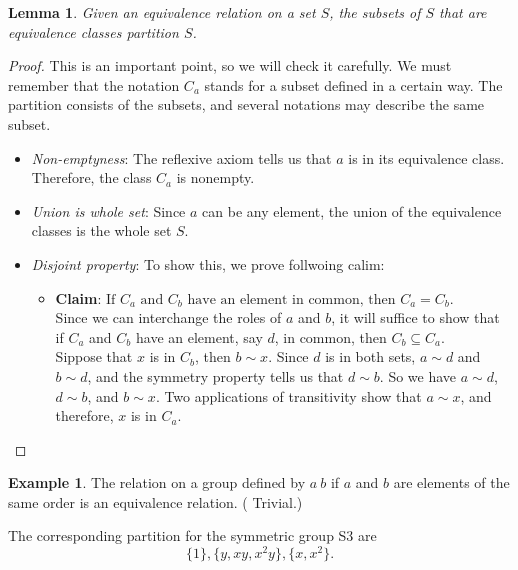 \documentclass[
]{book}
\providecommand{\tightlist}{%
  \setlength{\itemsep}{0pt}\setlength{\parskip}{0pt}}
\newtheorem{lemma}{Lemma}[chapter]
\theoremstyle{definition}
\theoremstyle{definition}
\newtheorem{example}{Example}[chapter]
\theoremstyle{definition}
\theoremstyle{definition}
\theoremstyle{remark}
\begin{document}
\begin{lemma}
\protect\hypertarget{lem:unnamed-chunk-28}{}\label{lem:unnamed-chunk-28}Given an equivalence relation on a set \(S\), the subsets of \(S\) that are equivalence classes partition \(S\).
\end{lemma}

\begin{proof}

This is an important point, so we will check it carefully. We must remember that the notation \(C_a\) stands for a subset defined in a certain way. The partition consists of the subsets, and several notations may describe the same subset.

\begin{itemize}
\item
  \emph{Non-emptyness}: The reflexive axiom tells us that \(a\) is in its equivalence class. Therefore, the class \(C_a\) is nonempty.
\item
  \emph{Union is whole set}: Since \(a\) can be any element, the union of the equivalence classes is the whole set \(S\).
\item
  \emph{Disjoint property}: To show this, we prove follwoing calim:

  \begin{itemize}
  \tightlist
  \item
    \textbf{Claim}: \(\text{If } C_a \text{ and } C_b \text{ have an element in common, then } C_a = C_b\).\\
    Since we can interchange the roles of \(a\) and \(b\), it will suffice to show that if \(C_a\) and \(C_b\) have an element, say \(d\), in common, then \(C_b \subseteq C_a\).\\
    Sippose that \(x\) is in \(C_b\), then \(b \sim x\). Since \(d\) is in both sets, \(a \sim d\) and \(b \sim d\), and the symmetry property tells us that \(d \sim b\). So we have \(a \sim d\), \(d \sim b\), and \(b \sim x\). Two applications of transitivity show that \(a \sim x\), and therefore, \(x\) is in \(C_a\).
  \end{itemize}
\end{itemize}

\end{proof}

\begin{example}
\protect\hypertarget{exm:272}{}\label{exm:272}The relation on a group defined by \(a ~ b\) if \(a\) and \(b\) are elements of the same order is an equivalence relation. ( Trivial.)

The corresponding partition for the symmetric group S3 are
\[\{1\}, \{y, xy, x^2y\}, \{x, x^2\}.\]
\end{example}
\end{document}
